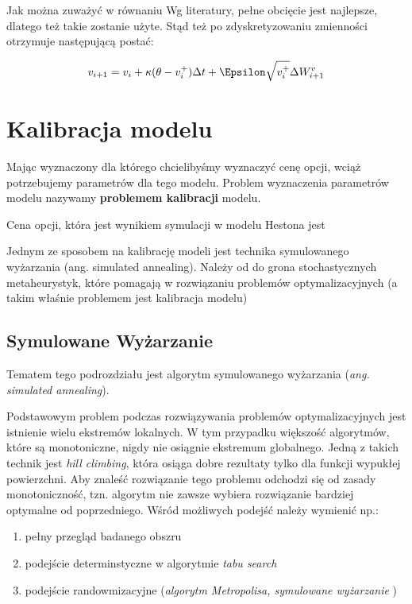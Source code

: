 \documentclass{pracamgr}
\begin{document}
Jak można zuważyć w równaniu  
Wg literatury, pełne obcięcie jest najlepsze, dlatego też takie zostanie użyte.
Stąd też po zdyskretyzowaniu zmienności otrzymuje następującą postać:

\begin{equation}
  v_{i+1} = v_i + \kappa (\theta - v_i^{+})\Delta t + \Epsilon \sqrt{v_i^{+}} \Delta W_{i+1}^v
\end{equation}



\chapter{Kalibracja modelu}
\label{chap:chapterModelCalibration}


Mając wyznaczony dla którego chcielibyśmy wyznaczyć cenę opcji, wciąż potrzebujemy parametrów dla tego modelu. 
Problem wyznaczenia parametrów modelu nazywamy \textbf{problemem kalibracji} modelu.  

Cena opcji, która jest wynikiem symulacji w modelu Hestona jest 

Jednym ze sposobem na kalibrację modeli jest technika symulowanego wyżarzania (ang. simulated annealing). Należy od do 
grona stochastycznych metaheurystyk, które pomagają w rozwiązaniu problemów optymalizacyjnych (a takim właśnie problemem jest
kalibracja modelu)



\section{Symulowane Wyżarzanie}

Tematem tego podrozdziału jest algorytm symulowanego wyżarzania  (\textit{ang. simulated annealing}). 

Podstawowym problem podczas rozwiązywania problemów optymalizacyjnych jest istnienie wielu ekstremów lokalnych.
W tym przypadku większość algorytmów, które są monotoniczne, nigdy nie osiągnie ekstremum globalnego. Jedną z takich technik jest \textit{hill climbing}, która osiąga dobre rezultaty tylko dla funkcji wypukłej powierzchni.
Aby znaleść rozwiązanie tego problemu odchodzi się od zasady monotoniczność, tzn. algorytm nie zawsze wybiera rozwiązanie bardziej optymalne od poprzedniego. 
Wśród możliwych podejść należy wymienić np.:
\begin{enumerate}
  \item pełny przegląd badanego obszru
  \item podejście determinstyczne w algorytmie \textit{tabu search}
  \item podejście randowmizacyjne (\textit{algorytm Metropolisa, symulowane wyżarzanie} \cite{OptimalizationBySimulatedAnnealing} )
\end{enumerate}
\end{document}
